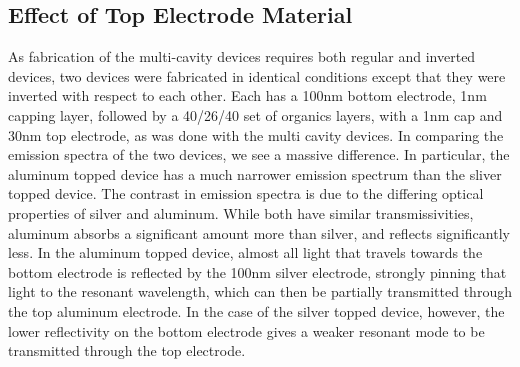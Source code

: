 \documentclass{report}
\begin{document}
        \subsection{Effect of Top Electrode Material} \label{topMaterial}

            As fabrication of the multi-cavity devices requires both regular and inverted devices, two devices were fabricated in identical conditions except that they were inverted with respect to each other. Each has a 100nm bottom electrode, 1nm capping layer, followed by a 40/26/40 set of organics layers, with a 1nm cap and 30nm top electrode, as was done with the multi cavity devices. In comparing the emission spectra of the two devices, we see a massive difference. In particular, the aluminum topped device has a much narrower emission spectrum than the sliver topped device. The contrast in emission spectra is due to the differing optical properties of silver and aluminum. While both have similar transmissivities, aluminum absorbs a significant amount more than silver, and reflects significantly less\cite{Stavrinou1999}. In the aluminum topped device, almost all light that travels towards the bottom electrode is reflected by the 100nm silver electrode, strongly pinning that light to the resonant wavelength, which can then be partially transmitted through the top aluminum electrode. In the case of the silver topped device, however, the lower reflectivity on the bottom electrode gives a weaker resonant mode to be transmitted through the top electrode.
\end{document}
